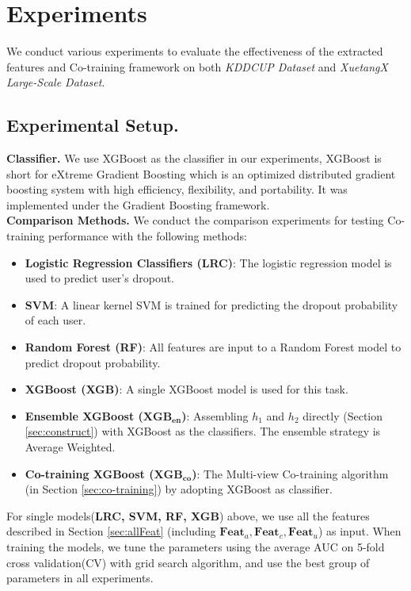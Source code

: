 \section{Experiments}
We conduct various experiments to evaluate the effectiveness of the extracted features and Co-training framework on both \textit{KDDCUP Dataset} and \textit{XuetangX Large-Scale Dataset}.

\subsection{Experimental Setup.} 
	\noindent\textbf{Classifier.}
	We use XGBoost as the classifier in our experiments, XGBoost is short for eXtreme Gradient Boosting\cite{Chen:2016:XST:2939672.2939785} which is an optimized distributed gradient boosting system with high efficiency, flexibility, and portability. It was implemented under the Gradient Boosting framework\cite{Friedman2001Greedy}. \\
    
	\noindent \textbf{Comparison Methods.}
	We conduct the comparison experiments for testing Co-training performance with the following methods:
	\begin{itemize}
		\item{\textbf{Logistic Regression Classifiers (LRC)}}: The logistic regression model is used to predict user's dropout.
		\item{\textbf{SVM}}: A linear kernel SVM is trained for predicting the dropout probability of each user.
		\item{\textbf{Random Forest (RF)}}: All features are input to a Random Forest model to predict dropout probability.
		\item{\textbf{XGBoost (XGB)}}: A single XGBoost model is used for this task.
		\item{\textbf{Ensemble XGBoost ($\mathbf{XGB_{en}}$)}}:  Assembling $h_1$ and $h_2$ directly (Section \ref{sec:construct}) with XGBoost as the classifiers. The ensemble strategy is Average Weighted.
		\item{\textbf{Co-training XGBoost ($\mathbf{XGB_{co}}$)}}: The Multi-view Co-training algorithm (in Section \ref{sec:co-training}) by adopting XGBoost as classifier.
\end{itemize}	
	For single models(\textbf{LRC, SVM,  RF, XGB}) above, we use all the features described in Section \ref{sec:allFeat} (including $\mathbf{Feat}_{a}, \mathbf{Feat}_{c}, \mathbf{Feat}_{u}$) as input. 
	When training the models,  we tune the parameters using the average AUC on 5-fold cross validation(CV) with grid search algorithm, and use the best group of parameters in all experiments.\\
	
